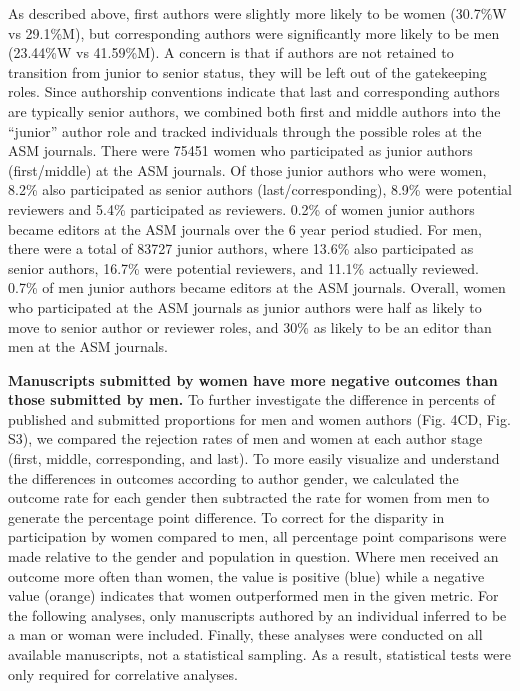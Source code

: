 \documentclass[11pt,]{article}
\begin{document}
As described above, first authors were slightly more likely to be women
(30.7\%W vs 29.1\%M), but corresponding authors were significantly more
likely to be men (23.44\%W vs 41.59\%M). A concern is that if authors
are not retained to transition from junior to senior status, they will
be left out of the gatekeeping roles. Since authorship conventions
indicate that last and corresponding authors are typically senior
authors, we combined both first and middle authors into the ``junior''
author role and tracked individuals through the possible roles at the
ASM journals. There were 75451 women who participated as junior authors
(first/middle) at the ASM journals. Of those junior authors who were
women, 8.2\% also participated as senior authors (last/corresponding),
8.9\% were potential reviewers and 5.4\% participated as reviewers.
0.2\% of women junior authors became editors at the ASM journals over
the 6 year period studied. For men, there were a total of 83727 junior
authors, where 13.6\% also participated as senior authors, 16.7\% were
potential reviewers, and 11.1\% actually reviewed. 0.7\% of men junior
authors became editors at the ASM journals. Overall, women who
participated at the ASM journals as junior authors were half as likely
to move to senior author or reviewer roles, and 30\% as likely to be an
editor than men at the ASM journals.

\textbf{Manuscripts submitted by women have more negative outcomes than
those submitted by men.} To further investigate the difference in
percents of published and submitted proportions for men and women
authors (Fig. 4CD, Fig. S3), we compared the rejection rates of men and
women at each author stage (first, middle, corresponding, and last). To
more easily visualize and understand the differences in outcomes
according to author gender, we calculated the outcome rate for each
gender then subtracted the rate for women from men to generate the
percentage point difference. To correct for the disparity in
participation by women compared to men, all percentage point comparisons
were made relative to the gender and population in question. Where men
received an outcome more often than women, the value is positive (blue)
while a negative value (orange) indicates that women outperformed men in
the given metric. For the following analyses, only manuscripts authored
by an individual inferred to be a man or woman were included. Finally,
these analyses were conducted on all available manuscripts, not a
statistical sampling. As a result, statistical tests were only required
for correlative analyses.
\end{document}
